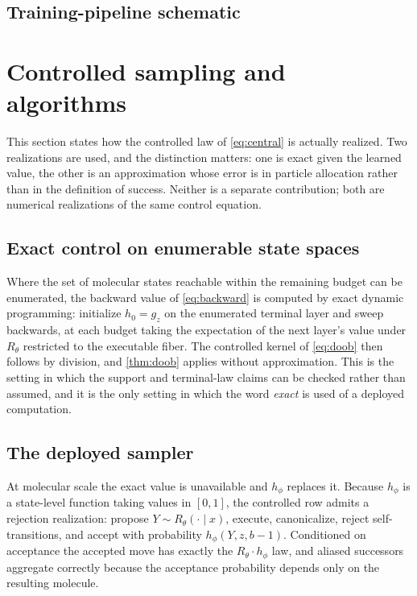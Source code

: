 \subsection{Training-pipeline schematic}



\section{Controlled sampling and algorithms}
\label{app:sampling}

This section states how the controlled law of \eqref{eq:central} is actually realized. Two realizations are used, and the distinction matters: one is exact given the learned value, the other is an approximation whose error is in particle allocation rather than in the definition of success. Neither is a separate contribution; both are numerical realizations of the same control equation.

\subsection{Exact control on enumerable state spaces}

Where the set of molecular states reachable within the remaining budget can be enumerated, the backward value of \eqref{eq:backward} is computed by exact dynamic programming: initialize $h_0=g_z$ on the enumerated terminal layer and sweep backwards, at each budget taking the expectation of the next layer's value under $R_\theta$ restricted to the executable fiber. The controlled kernel of \eqref{eq:doob} then follows by division, and \cref{thm:doob} applies without approximation. This is the setting in which the support and terminal-law claims can be checked rather than assumed, and it is the only setting in which the word \emph{exact} is used of a deployed computation.

\subsection{The deployed sampler}

At molecular scale the exact value is unavailable and $h_\phi$ replaces it. Because $h_\phi$ is a state-level function taking values in $[0,1]$, the controlled row admits a rejection realization: propose $Y\sim R_\theta(\cdot\mid x)$, execute, canonicalize, reject self-transitions, and accept with probability $h_\phi(Y,z,b-1)$. Conditioned on acceptance the accepted move has exactly the $R_\theta\cdot h_\phi$ law, and aliased successors aggregate correctly because the acceptance probability depends only on the resulting molecule.

